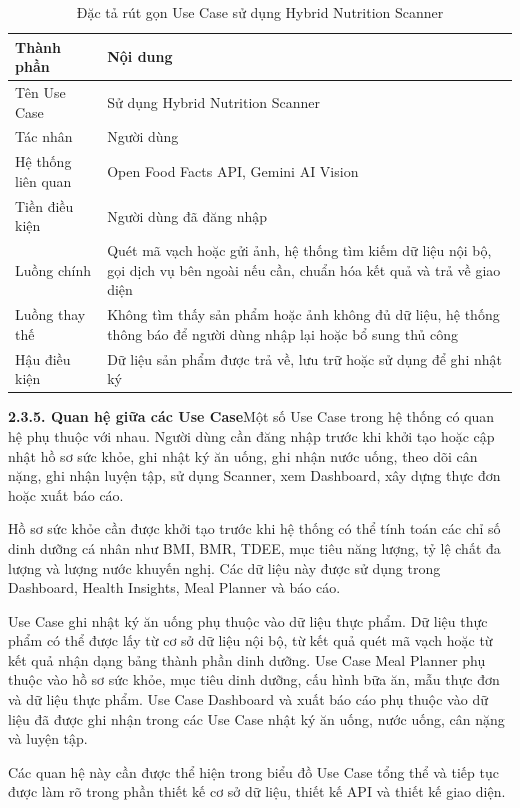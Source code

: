 \begin{table}[H]
\centering
\caption{Đặc tả rút gọn Use Case sử dụng Hybrid Nutrition Scanner}
\begin{tabular}{|p{4cm}|p{11cm}|}
\hline
\textbf{Thành phần} & \textbf{Nội dung} \\ \hline
Tên Use Case & Sử dụng Hybrid Nutrition Scanner \\ \hline
Tác nhân & Người dùng \\ \hline
Hệ thống liên quan & Open Food Facts API, Gemini AI Vision \\ \hline
Tiền điều kiện & Người dùng đã đăng nhập \\ \hline
Luồng chính & Quét mã vạch hoặc gửi ảnh, hệ thống tìm kiếm dữ liệu nội bộ, gọi dịch vụ bên ngoài nếu cần, chuẩn hóa kết quả và trả về giao diện \\ \hline
Luồng thay thế & Không tìm thấy sản phẩm hoặc ảnh không đủ dữ liệu, hệ thống thông báo để người dùng nhập lại hoặc bổ sung thủ công \\ \hline
Hậu điều kiện & Dữ liệu sản phẩm được trả về, lưu trữ hoặc sử dụng để ghi nhật ký \\ \hline
\end{tabular}
\end{table}

\textbf{2.3.5. Quan hệ giữa các Use Case}Một số Use Case trong hệ thống có quan hệ phụ thuộc với nhau. Người dùng cần đăng nhập trước khi khởi tạo hoặc cập nhật hồ sơ sức khỏe, ghi nhật ký ăn uống, ghi nhận nước uống, theo dõi cân nặng, ghi nhận luyện tập, sử dụng Scanner, xem Dashboard, xây dựng thực đơn hoặc xuất báo cáo.

Hồ sơ sức khỏe cần được khởi tạo trước khi hệ thống có thể tính toán các chỉ số dinh dưỡng cá nhân như BMI, BMR, TDEE, mục tiêu năng lượng, tỷ lệ chất đa lượng và lượng nước khuyến nghị. Các dữ liệu này được sử dụng trong Dashboard, Health Insights, Meal Planner và báo cáo.

Use Case ghi nhật ký ăn uống phụ thuộc vào dữ liệu thực phẩm. Dữ liệu thực phẩm có thể được lấy từ cơ sở dữ liệu nội bộ, từ kết quả quét mã vạch hoặc từ kết quả nhận dạng bảng thành phần dinh dưỡng. Use Case Meal Planner phụ thuộc vào hồ sơ sức khỏe, mục tiêu dinh dưỡng, cấu hình bữa ăn, mẫu thực đơn và dữ liệu thực phẩm. Use Case Dashboard và xuất báo cáo phụ thuộc vào dữ liệu đã được ghi nhận trong các Use Case nhật ký ăn uống, nước uống, cân nặng và luyện tập.

Các quan hệ này cần được thể hiện trong biểu đồ Use Case tổng thể và tiếp tục được làm rõ trong phần thiết kế cơ sở dữ liệu, thiết kế API và thiết kế giao diện.

